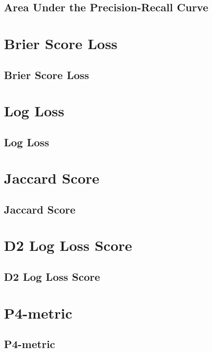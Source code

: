 \subsection{Area Under the Precision-Recall Curve}

\clearpage
\thispagestyle{classificationstyle}
\section{Brier Score Loss}
\subsection{Brier Score Loss}

\clearpage
\thispagestyle{classificationstyle}
\section{Log Loss}
\subsection{Log Loss}

\clearpage
\thispagestyle{classificationstyle}
\section{Jaccard Score}
\subsection{Jaccard Score}

\clearpage
\thispagestyle{classificationstyle}
\section{D2 Log Loss Score}
\subsection{D2 Log Loss Score}

\clearpage
\thispagestyle{classificationstyle}
\section{P4-metric}
\subsection{P4-metric}

